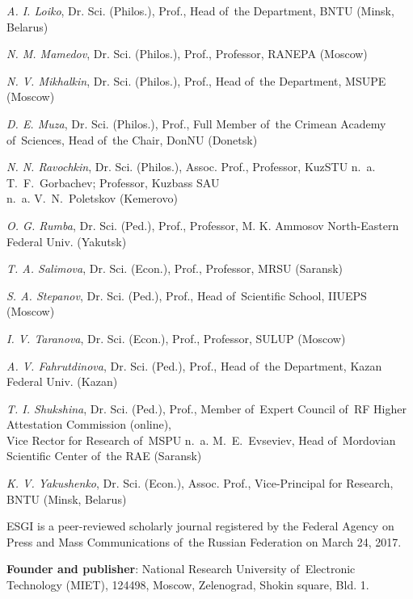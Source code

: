 \begin{otherlanguage}{english}
\begin{multicols}{2}
\begin{flushleft}
\noindent \textit{A. I. Loiko}, Dr. Sci. (Philos.), Prof., Head of the Department, BNTU (Minsk, Belarus)

\noindent \textit{N. M. Mamedov}, Dr. Sci. (Philos.), Prof., Professor, RANEPA (Moscow)

\noindent \textit{N. V. Mikhalkin}, Dr. Sci. (Philos.), Prof., Head of the Department, MSUPE (Moscow)

\noindent \textit{D. E. Muza}, Dr. Sci. (Philos.), Prof., Full Member of the Crimean Academy of Sciences, Head of the Chair, DonNU (Donetsk)

\noindent \textit{N. N. Ravochkin}, Dr. Sci. (Philos.), Assoc. Prof., Professor, KuzSTU n. a. T. F. Gorbachev; Professor, Kuzbass SAU\\ n. a. V. N. Poletskov (Kemerovo)

\noindent \textit{O. G. Rumba}, Dr. Sci. (Ped.), Prof., Professor, M. K. Ammosov North-Eastern Federal Univ. (Yakutsk)

\noindent \textit{T. A. Salimova}, Dr. Sci. (Econ.), Prof., Professor, MRSU (Saransk)

\noindent \textit{S. A. Stepanov}, Dr. Sci. (Ped.), Prof., Head of Scientific School, IIUEPS (Moscow)

\noindent \textit{I. V. Taranova}, Dr. Sci. (Econ.), Prof., Professor, SULUP (Moscow)

\noindent \textit{A. V. Fahrutdinova}, Dr. Sci. (Ped.), Prof., Head of the Department, Kazan Federal Univ. (Kazan)

\noindent \textit{T. I. Shukshina}, Dr. Sci. (Ped.), Prof., Member of Expert Council of RF Higher Attestation Commission (online),\\ Vice Rector for Research of MSPU n. a. M. E. Evseviev, Head of Mordovian Scientific Center of the RAE (Saransk)

\noindent \textit{K. V. Yakushenko}, Dr. Sci. (Econ.), Assoc. Prof., Vice-Principal for Research, BNTU (Minsk, Belarus)

   \end{flushleft}    
\end{multicols}

\begin{flushleft}
\scriptsize
ESGI is a peer-reviewed scholarly journal registered by the Federal Agency on Press and Mass Communications
of the Russian Federation on March 24, 2017.

\vspace{1em}
\textbf{Founder and publisher}: National Research University of Electronic Technology (MIET), 124498, Moscow,
Zelenograd, Shokin square, Bld. 1.
\end{flushleft}


\end{otherlanguage}

